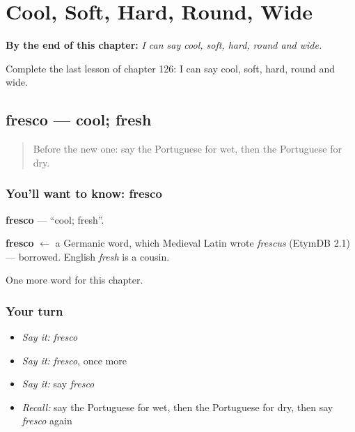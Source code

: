 
\chapter{Cool, Soft, Hard, Round, Wide}
\label{ch:pt-cool-soft-hard-round-wide}

\begin{chapteropening}
\textbf{By the end of this chapter:} \emph{I can say cool, soft, hard, round and wide.}

Complete the last lesson of chapter 126: I can say cool, soft, hard, round and wide.
\end{chapteropening}

\section[fresco]{fresco — cool; fresh}

\label{lesson:PT-C126-fresco}



\begin{quote}
Before the new one: say the Portuguese for wet, then the Portuguese for dry.
\end{quote}

\subsection*{You'll want to know: fresco}
\textbf{fresco} — \textquotedblleft{}cool; fresh\textquotedblright{}.

\begin{cousinweb}
\textbf{fresco} $\leftarrow$ a Germanic word, which Medieval Latin wrote \emph{frescus} (EtymDB 2.1) — borrowed. English \emph{fresh} is a cousin.
\end{cousinweb}

\begin{grammarlens}[title={What you've built}]
One more word for this chapter.
\end{grammarlens}

\subsection*{Your turn}
\begin{itemize}
\raggedright
  \item \emph{Say it:} \emph{fresco}
  \item \emph{Say it:} \emph{fresco}, once more
  \item \emph{Say it:} say \emph{fresco}
  \item \emph{Recall:} say the Portuguese for wet, then the Portuguese for dry, then say \emph{fresco} again
\end{itemize}

